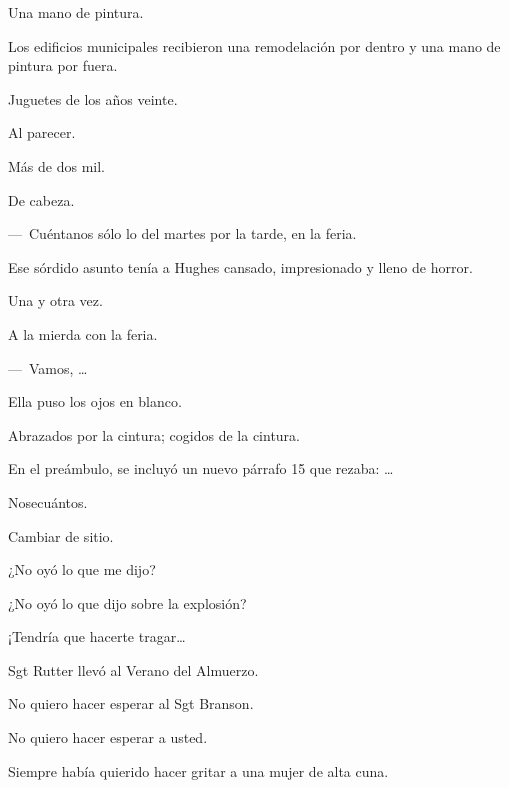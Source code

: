 \sk
Una mano de pintura. 

\sk
Los edificios municipales recibieron una remodelación por dentro y una mano de pintura por fuera. \nb{}

\sk
Juguetes de los años veinte. 

\sk
Al parecer. 

\sk
Más de dos mil. 

\sk
De cabeza. 

\sk
---~Cuéntanos sólo lo del martes por la tarde, en la feria. 

\sk
Ese sórdido asunto tenía a Hughes cansado, impresionado y lleno de horror. 

\sk
Una y otra vez. 

\sk
A la mierda con la feria. 

\sk
---~Vamos, \ldots{} 

\sk
Ella puso los ojos en blanco. 

\sk
Abrazados por la cintura; cogidos de la cintura. 

\sk
En el preámbulo, se incluyó un nuevo párrafo 15 que rezaba: \ldots{} 

\sk
Nosecuántos. 

\sk
Cambiar de sitio. 

\sk
¿No oyó lo que me dijo? 

\sk
¿No oyó lo que dijo sobre la explosión? 

\sk
¡Tendría que hacerte tragar\ldots{} 

\sk
Sgt Rutter llevó al Verano del Almuerzo. 

\sk
No quiero hacer esperar al Sgt Branson. 

\sk
No quiero hacer esperar a usted. \nb{}

\sk
Siempre había quierido hacer gritar a una mujer de alta cuna. 

